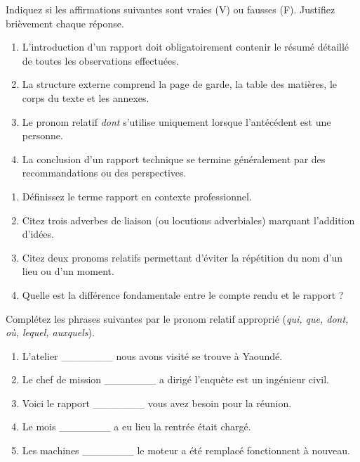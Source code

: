 \documentclass[11pt]{article}
\newcommand{\cle}[1]{{\popxbold\color{popdark}#1}}
\begin{document}
\begin{exercice}
Indiquez si les affirmations suivantes sont vraies (V) ou fausses (F). Justifiez brièvement chaque réponse.
\begin{enumerate}
    \item L'introduction d'un rapport doit obligatoirement contenir le résumé détaillé de toutes les observations effectuées.
    \item La structure externe comprend la page de garde, la table des matières, le corps du texte et les annexes.
    \item Le pronom relatif \emph{dont} s'utilise uniquement lorsque l'antécédent est une personne.
    \item La conclusion d'un rapport technique se termine généralement par des recommandations ou des perspectives.
\end{enumerate}
\end{exercice}

\begin{exercice}
\begin{enumerate}
    \item Définissez le terme \cle{rapport} en contexte professionnel.
    \item Citez trois \cle{adverbes de liaison} (ou locutions adverbiales) marquant l'addition d'idées.
    \item Citez deux \cle{pronoms relatifs} permettant d'éviter la répétition du nom d'un lieu ou d'un moment.
    \item Quelle est la différence fondamentale entre le \cle{compte rendu} et le \cle{rapport} ?
\end{enumerate}
\end{exercice}

\begin{exercice}
Complétez les phrases suivantes par le pronom relatif approprié (\emph{qui, que, dont, où, lequel, auxquels}).
\begin{enumerate}
    \item L'atelier \_\_\_\_\_\_\_ nous avons visité se trouve à Yaoundé.
    \item Le chef de mission \_\_\_\_\_\_\_ a dirigé l'enquête est un ingénieur civil.
    \item Voici le rapport \_\_\_\_\_\_\_ vous avez besoin pour la réunion.
    \item Le mois \_\_\_\_\_\_\_ a eu lieu la rentrée était chargé.
    \item Les machines \_\_\_\_\_\_\_ le moteur a été remplacé fonctionnent à nouveau.
\end{enumerate}
\end{exercice}
\end{document}
